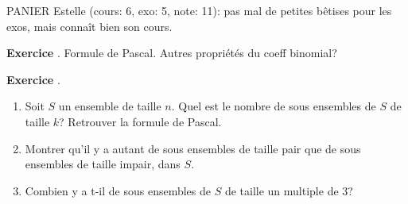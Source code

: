 \documentclass[10pt,a4paper]{article}
\newcounter{question}
\newcounter{exo}
\newenvironment{exo}{\vspace{0.5cm}\setcounter{question}{0}\addtocounter{exo}{1} \noindent \textbf{Exercice \theexo}. \normalsize }{\par}
\begin{document}
	PANIER Estelle (cours: 6, exo: 5, note: 11): pas mal de petites bêtises pour les exos, mais connaît bien son cours.
	
	\begin{exo}
		Formule de Pascal. Autres propriétés du coeff binomial?
	\end{exo}
	\begin{exo}
		\begin{enumerate}
			\item Soit $S$ un ensemble de taille $n$. Quel est le nombre de sous ensembles de $S$ de taille $k$? Retrouver la formule de Pascal.
			\item Montrer qu'il y a autant de sous ensembles de taille pair que de sous ensembles de taille impair, dans $S$.
			\item Combien y a t-il de sous ensembles de $S$ de taille un multiple de 3?
		\end{enumerate}
	\end{exo}
	
\end{document}
